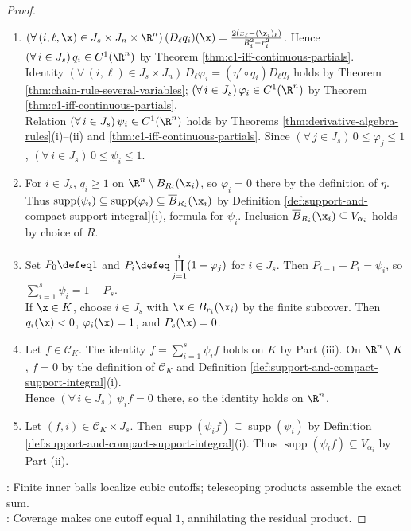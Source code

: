 \begin{theorem}
\begin{proof}
\begin{enumerate}[label=(\roman*)]
\setlength{\itemsep}{0pt}
\item $(\forall\,(i,\ell,\x)\in J_s\times J_n\times\R^n)\,(D_\ell q_i)(\x)=\frac{2(x_\ell-(\x_i)_\ell)}{R_i^2-r_i^2}$. Hence $(\forall\,i\in J_s)\,q_i\in C^1(\R^n)$ by Theorem \ref{thm:c1-iff-continuous-partials}.\\
Identity $(\forall\,(i,\ell)\in J_s\times J_n)\,D_\ell\varphi_i=(\eta'\circ q_i)D_\ell q_i$ holds by Theorem \ref{thm:chain-rule-several-variables}; $(\forall\,i\in J_s)\,\varphi_i\in C^1(\R^n)$ by Theorem \ref{thm:c1-iff-continuous-partials}.\\
Relation $(\forall\,i\in J_s)\,\psi_i\in C^1(\R^n)$ holds by Theorems \ref{thm:derivative-algebra-rules}(i)--(ii) and \ref{thm:c1-iff-continuous-partials}. Since $(\forall\,j\in J_s)\,0\leq\varphi_j\leq1$, $(\forall\,i\in J_s)\,0\leq\psi_i\leq1$.
\item For $i\in J_s$, $q_i\geq1$ on $\R^n\setminus B_{R_i}(\x_i)$, so $\varphi_i=0$ there by the definition of $\eta$.\\
Thus $\operatorname{supp}(\psi_i)\subseteq\operatorname{supp}(\varphi_i)\subseteq\overline{B}_{R_i}(\x_i)$ by Definition \ref{def:support-and-compact-support-integral}(i), formula for $\psi_i$. Inclusion $\overline{B}_{R_i}(\x_i)\subseteq V_{\alpha_i}$ holds by choice of $R$.
\item Set $P_0\defeq1$ and $P_i\defeq\prod\limits_{j=1}^{i}(1-\varphi_j)$ for $i\in J_s$. Then $P_{i-1}-P_i=\psi_i$, so $\sum\limits_{i=1}^{s}\psi_i=1-P_s$.\\
If $\x\in K$, choose $i\in J_s$ with $\x\in B_{r_i}(\x_i)$ by the finite subcover. Then $q_i(\x)<0$, $\varphi_i(\x)=1$, and $P_s(\x)=0$.
\item Let $f\in\mathcal C_K$. The identity $f=\sum\limits_{i=1}^{s}\psi_i f$ holds on $K$ by Part (iii). On $\R^n\setminus K$, $f=0$ by the definition of $\mathcal C_K$ and Definition \ref{def:support-and-compact-support-integral}(i).\\
Hence $(\forall\,i\in J_s)\,\psi_i f=0$ there, so the identity holds on $\R^n$.
\item Let $(f,i)\in\mathcal C_K\times J_s$. Then $\operatorname{supp}(\psi_i f)\subseteq\operatorname{supp}(\psi_i)$ by Definition \ref{def:support-and-compact-support-integral}(i). Thus $\operatorname{supp}(\psi_i f)\subseteq V_{\alpha_i}$ by Part (ii).
\end{enumerate}
: Finite inner balls localize cubic cutoffs; telescoping products assemble the exact sum.\\
: Coverage makes one cutoff equal $1$, annihilating the residual product.
\end{proof}
\end{theorem}

